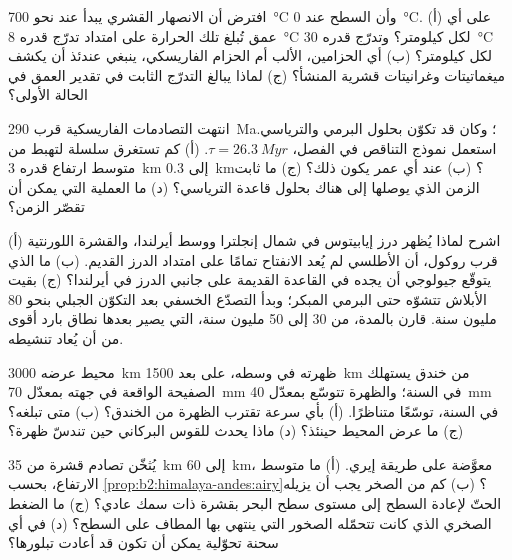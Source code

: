 \begin{exercise}[$\star\star$]\label{exo:b2:wilson-cycle:7}
افترض أن الانصهار القشري يبدأ عند نحو \qty{700}{\celsius} وأن السطح عند
\qty{0}{\celsius}. (أ) على أي عمق تُبلغ تلك الحرارة على امتداد تدرّج قدره
\qty{8}{\celsius} لكل كيلومتر؟ وتدرّج قدره \qty{30}{\celsius} لكل كيلومتر؟ (ب) أي الحزامين، الألب
أم الحزام الفاريسكي، ينبغي عندئذ أن يكشف ميغماتيتات وغرانيتات قشرية المنشأ؟
(ج) لماذا يبالغ التدرّج الثابت في تقدير العمق في الحالة الأولى؟
\end{exercise}

\begin{exercise}[$\star\star$]\label{exo:b2:wilson-cycle:8}
انتهت التصادمات الفاريسكية قرب \qty{290}{Ma}؛ وكان  قد تكوّن بحلول البرمي
والترياسي. استعمل نموذج التناقص في الفصل، $\tau = \qty{26.3}{Myr}$. (أ) كم تستغرق
سلسلة لتهبط من متوسط ارتفاع قدره \qty{3}{km} إلى \qty{0.3}{km}؟ (ب) عند أي عمر يكون
ذلك؟ (ج) ما ثابت الزمن الذي يوصلها إلى هناك بحلول قاعدة الترياسي؟ (د) ما
العملية التي يمكن أن تقصّر الزمن؟
\end{exercise}

\begin{exercise}[$\star\star$]\label{exo:b2:wilson-cycle:9}
(أ) اشرح لماذا يُظهر درز إيابيتوس في شمال إنجلترا ووسط أيرلندا، والقشرة اللورنتية
قرب روكول، أن الأطلسي لم يُعد الانفتاح تمامًا على امتداد الدرز القديم.
(ب) ما الذي يتوقّع جيولوجي أن يجده في القاعدة القديمة على جانبي الدرز
في أيرلندا؟ (ج) بقيت الأبلاش تتشوّه حتى البرمي المبكر؛ وبدأ التصدّع الخسفي
بعد التكوّن الجبلي بنحو 80 مليون سنة. قارن بالمدة، من 30 إلى 50 مليون سنة، التي يصير بعدها
نطاق بارد أقوى من أن يُعاد تنشيطه.
\end{exercise}

\begin{exercise}[$\star\star\star$]\label{exo:b2:wilson-cycle:10}
محيط عرضه \qty{3000}{km} ظهرته في وسطه، على بعد \qty{1500}{km} من خندق
يستهلك الصفيحة الواقعة في جهته بمعدّل \qty{70}{mm} في السنة؛ والظهرة تتوسّع بمعدّل \qty{40}{mm} في
السنة، توسّعًا متناظرًا. (أ) بأي سرعة تقترب الظهرة من الخندق؟ (ب) متى
تبلغه؟ (ج) ما عرض المحيط حينئذ؟ (د) ماذا يحدث للقوس البركاني حين تندسّ
ظهرة؟
\end{exercise}

\begin{exercise}[$\star\star\star$]\label{exo:b2:wilson-cycle:11}
يُثخّن تصادم قشرة من \qty{35}{km} إلى \qty{60}{km}، معوَّضة على طريقة إيري.
(أ) ما متوسط الارتفاع، بحسب \cref{prop:b2:himalaya-andes:airy}؟ (ب) كم من الصخر يجب أن
يزيله الحتّ لإعادة السطح إلى مستوى سطح البحر بقشرة ذات سمك عادي؟
(ج) ما الضغط الصخري الذي كانت تتحمّله الصخور التي ينتهي بها المطاف على السطح؟ (د) في أي
سحنة تحوّلية يمكن أن تكون قد أعادت تبلورها؟
\end{exercise}

